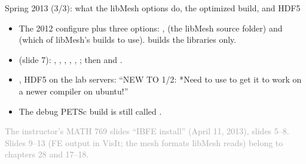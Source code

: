 \documentclass[aspectratio=169,11pt]{beamer}
\newcommand{\sourcecredit}[1]{\vfill\begin{flushright}\tiny\textcolor{DarkGray}{#1}\end{flushright}}
\begin{document}
\begin{frame}{Spring 2013 (3/3): what the libMesh options do, the optimized build, and HDF5}
\label{fr:ibfe2013b}
\small
\begin{itemize}\setlength{\itemsep}{2pt}
  \item The 2012 configure plus three options: ,  (the libMesh source folder) and  (which of libMesh's builds to use).  builds the libraries only.
  \item {} (slide 7): , , , , , ; then  and .
  \item {}, HDF5 on the lab servers: ``NEW TO 1/2: *Need to use  to get it to work on a newer compiler on ubuntu!''
  \item The debug PETSc build is still called .
\end{itemize}
\sourcecredit{The instructor's MATH 769 slides ``IBFE install'' (April 11, 2013), slides 5--8. Slides 9--13 (FE output in VisIt; the mesh formats libMesh reads) belong to chapters 28 and 17--18.}
\end{frame}
\end{document}
